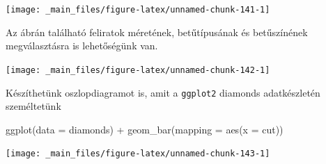 \documentclass[
]{book}
\newenvironment{Shaded}{\begin{snugshade}}{\end{snugshade}}
\newcommand{\AttributeTok}[1]{\textcolor[rgb]{0.77,0.63,0.00}{#1}}
\newcommand{\DecValTok}[1]{\textcolor[rgb]{0.00,0.00,0.81}{#1}}
\newcommand{\FunctionTok}[1]{\textcolor[rgb]{0.00,0.00,0.00}{#1}}
\newcommand{\NormalTok}[1]{#1}
\newcommand{\SpecialCharTok}[1]{\textcolor[rgb]{0.00,0.00,0.00}{#1}}
\newcommand{\StringTok}[1]{\textcolor[rgb]{0.31,0.60,0.02}{#1}}
\begin{document}
\begin{center}\texttt{[image: \_main\_files/figure-latex/unnamed-chunk-141-1]} \end{center}

Az ábrán található feliratok méretének, betűtípusának és betűszínének
megválasztásra is lehetőségünk van.

\begin{Shaded}
\end{Shaded}

\begin{center}\texttt{[image: \_main\_files/figure-latex/unnamed-chunk-142-1]} \end{center}

Készíthetünk oszlopdiagramot is, amit a \texttt{ggplot2} diamonds
adatkészletén személtetünk

\begin{Shaded}
\begin{Highlighting}[]
\FunctionTok{ggplot}\NormalTok{(}\AttributeTok{data =}\NormalTok{ diamonds) }\SpecialCharTok{+}
  \FunctionTok{geom\_bar}\NormalTok{(}\AttributeTok{mapping =} \FunctionTok{aes}\NormalTok{(}\AttributeTok{x =}\NormalTok{ cut))}
\end{Highlighting}
\end{Shaded}

\begin{center}\texttt{[image: \_main\_files/figure-latex/unnamed-chunk-143-1]} \end{center}
\end{document}
